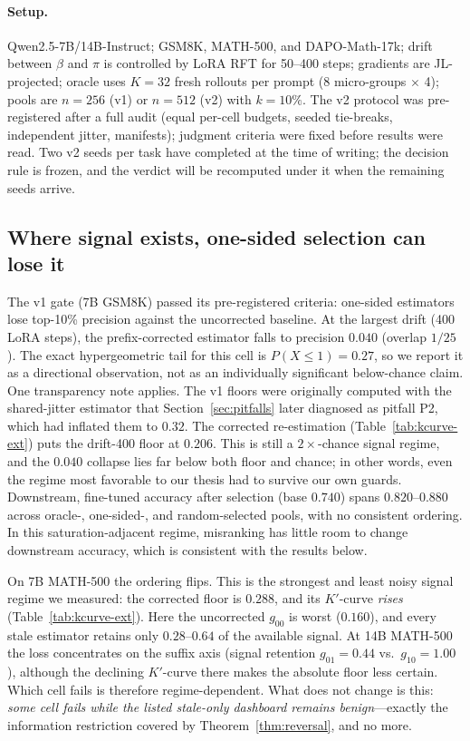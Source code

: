 \documentclass[11pt]{article}
\newcommand{\goo}{g_{00}}
\newcommand{\gto}{g_{10}}
\newcommand{\got}{g_{01}}
\begin{document}
\paragraph{Setup.} Qwen2.5-7B/14B-Instruct; GSM8K, MATH-500, and
DAPO-Math-17k; drift between $\beta$ and $\pi$ is controlled by LoRA RFT for
50--400 steps; gradients are JL-projected; oracle uses $K{=}32$ fresh rollouts
per prompt (8 micro-groups $\times$ 4); pools are $n{=}256$ (v1) or $n{=}512$
(v2) with $k{=}10\%$. The v2 protocol was pre-registered after a full audit
(equal per-cell budgets, seeded tie-breaks, independent jitter, manifests);
judgment criteria were fixed before results were read. Two v2 seeds per task
have completed at the time of writing; the decision rule is frozen, and the
verdict will be recomputed under it when the remaining seeds arrive.

\subsection{Where signal exists, one-sided selection can lose it}

The v1 gate (7B GSM8K) passed its pre-registered criteria: one-sided
estimators lose top-10\% precision against the uncorrected baseline. At the
largest drift (400 LoRA steps), the prefix-corrected estimator falls to
precision $0.040$ (overlap $1/25$). The exact hypergeometric tail for this
cell is $P(X\le 1)=0.27$, so we report it as a directional observation, not
as an individually significant below-chance claim. One transparency note
applies. The v1 floors were originally computed with the shared-jitter
estimator that Section~\ref{sec:pitfalls} later diagnosed as pitfall P2,
which had inflated them to $0.32$. The corrected re-estimation
(Table~\ref{tab:kcurve-ext}) puts the drift-400 floor at $0.206$. This is
still a $2\times$-chance signal regime, and the $0.040$ collapse lies far
below both floor and chance; in other words, even the regime most favorable
to our thesis had to survive our own guards. Downstream, fine-tuned accuracy
after selection (base $0.740$) spans $0.820$--$0.880$ across oracle-,
one-sided-, and random-selected pools, with no consistent ordering. In this
saturation-adjacent regime, misranking has little room to change downstream
accuracy, which is consistent with the results below.

On 7B MATH-500 the ordering flips. This is the strongest and least noisy
signal regime we measured: the corrected floor is $0.288$, and its
$K'$-curve \emph{rises} (Table~\ref{tab:kcurve-ext}). Here the uncorrected
$\goo$ is worst ($0.160$), and every stale estimator retains only
$0.28$--$0.64$ of the available signal. At 14B MATH-500 the loss concentrates
on the suffix axis (signal retention $\got{=}0.44$ vs.\ $\gto{=}1.00$),
although the declining $K'$-curve there makes the absolute floor less
certain. Which cell fails is therefore regime-dependent. What does not change
is this: \emph{some cell fails while the listed stale-only dashboard remains
benign}---exactly the information restriction covered by
Theorem~\ref{thm:reversal}, and no more.
\end{document}

